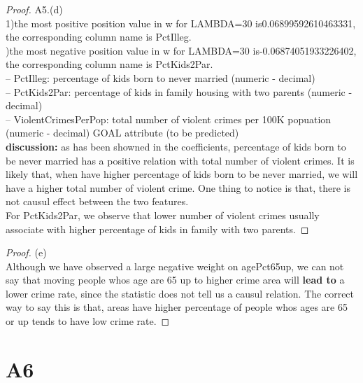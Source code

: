 \documentclass[12pt]{article}
\begin{document}
\newpage
\begin{proof}
        A5.(d)\\     
        1)the most positive position value in w for LAMBDA=30  is0.06899592610463331, the corresponding column name is PctIlleg.\\

   )the most negative position value in w for LAMBDA=30  is-0.06874051933226402, the corresponding column name is PctKids2Par.\\

     \noindent    -- PctIlleg: percentage of kids born to never married (numeric - decimal)\\

\noindent -- PctKids2Par: percentage of kids in family housing with two parents (numeric - decimal)\\

\noindent -- ViolentCrimesPerPop: total number of violent crimes per 100K popuation (numeric - decimal) GOAL attribute (to be predicted)\\ 

\noindent \textbf{discussion:} as has been showned in the coefficients, percentage of kids born to be never married has a positive relation with total number of violent crimes. It is likely that, when have higher percentage of kids born to be never married, we will have a higher total number of violent crime. One thing to notice is that, there is not causul effect between the two features.       \\
For PctKids2Par, we observe that lower number of violent crimes usually associate with higher percentage of kids in family with two parents.

\end{proof}

\begin{proof}
        (e)\\     
        Although we have observed a large negative weight on 
        agePct65up, we can not say that moving people whos age are 65 up to higher crime area will \textbf{lead to} a lower crime rate, since the statistic does not tell us a causul relation. The correct way to say this is that, areas have higher percentage of people whos ages are 65 or up tends to have low crime rate. 
\end{proof}

\newpage
\section*{A6}
\end{document}
